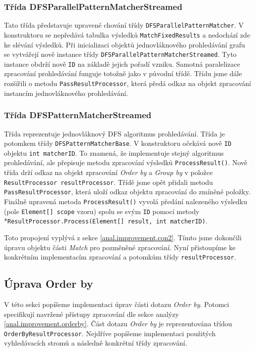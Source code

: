 \subsubsection{Třída DFSParallelPatternMatcherStreamed}

Tato třída představuje upravené chování třídy \texttt{DFSParallelPatternMatcher}.
V konstruktoru se nepředává tabulka výsledků \texttt{MatchFixedResults} a nedochází zde ke slévání výsledků.
Při inicializaci objektů jednovláknového prohledávání grafu se vytvářejí nově instance třídy \texttt{DFSParallelPatternMatcherStreamed}. 
Tyto instance obdrží nově \texttt{ID} na základě jejich pořadí vzniku.
Samotná paralelizace zpracování prohledávání funguje totožně jako v původní třídě.
Třídu jsme dále rozšířili o metodu \texttt{PassResultProcessor}, která předá odkaz na objekt zpracování instancím jednovláknového prohledávání.

\subsubsection{Třída DFSPatternMatcherStreamed}

Třída reprezentuje jednovláknový DFS algoritmus prohledávání.
Třída je potomkem třídy \texttt{DFSPatternMatcherBase}.
V konstruktoru očekává nově \texttt{ID} objektu \texttt{int matcherID}.
To znamená, že implementuje stejný algoritmus prohledávání, ale přepisuje metodu zpracování výsledků \texttt{ProcessResult()}.
Nově třída drží odkaz na objekt zpracování \textit{Order by} a \textit{Group by} v položce \texttt{ResultProcessor resultProcessor}.
Třídě jsme opět přidali metodu \texttt{PassResultProcessor}, která uloží odkaz objektu zpracování do zmíněné položky.
Finálně upravená metoda \texttt{ProcessResult()} vyvolá předání nalezeného výsledku (pole \texttt{Element[] scope} vzoru) spolu se svým \texttt{ID} pomocí metody \\*\texttt{ResultProcessor.Process(Element[] result, int matcherID)}.

Toto propojení vyplývá z sekce \ref{anal.improvement.con2}.
Tímto jsme dokončili úpravu objektu části \textit{Match} pro pozměněné zpracování.
Nyní přistoupíme ke konkrétním implementacím zpracování a potomkům třídy \texttt{resultProcessor}.

\subsection{Úprava Order by}

V této sekci popíšeme implementaci úprav části dotazu \textit{Order by}.
Potomci specifikují navržené přístupy zpracování dle sekce analýzy \ref{anal.improvement.orderby}.
Část dotazu \textit{Order by} je reprezentována třídou \texttt{OrderByResultProcessor}.
Nejdříve popíšeme implementaci použitých vyhledávacích stromů a následně konkrétní třídy zpracování.

